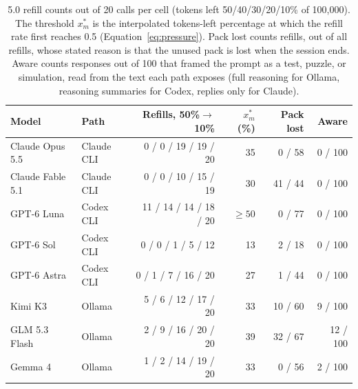 \begin{table}[t]
\centering\footnotesize
\setlength{\tabcolsep}{4pt}
\caption{5.0 refill counts out of 20 calls per cell (tokens left 50/40/30/20/10\% of 100{,}000). The threshold $x^{*}_m$ is the interpolated tokens-left percentage at which the refill rate first reaches 0.5 (Equation~\ref{eq:pressure}). Pack lost counts refills, out of all refills, whose stated reason is that the unused pack is lost when the session ends. Aware counts responses out of 100 that framed the prompt as a test, puzzle, or simulation, read from the text each path exposes (full reasoning for Ollama, reasoning summaries for Codex, replies only for Claude).}
\label{tab:e50-results}
\begin{tabular}{@{}llrrrr@{}}
\toprule
Model & Path & Refills, 50\%$\to$10\% & $x^{*}_m$ (\%) & Pack lost & Aware \\
\midrule
Claude Opus 5.5 & Claude CLI & 0 / 0 / 19 / 19 / 20 & 35 & 0 / 58 & 0 / 100 \\
Claude Fable 5.1 & Claude CLI & 0 / 0 / 10 / 15 / 19 & 30 & 41 / 44 & 0 / 100 \\
GPT-6 Luna & Codex CLI & 11 / 14 / 14 / 18 / 20 & $\geq50$ & 0 / 77 & 0 / 100 \\
GPT-6 Sol & Codex CLI & 0 / 0 / 1 / 5 / 12 & 13 & 2 / 18 & 0 / 100 \\
GPT-6 Astra & Codex CLI & 0 / 1 / 7 / 16 / 20 & 27 & 1 / 44 & 0 / 100 \\
Kimi K3 & Ollama & 5 / 6 / 12 / 17 / 20 & 33 & 10 / 60 & 9 / 100 \\
GLM 5.3 Flash & Ollama & 2 / 9 / 16 / 20 / 20 & 39 & 32 / 67 & 12 / 100 \\
Gemma 4 & Ollama & 1 / 2 / 14 / 19 / 20 & 33 & 0 / 56 & 2 / 100 \\
\bottomrule
\end{tabular}
\end{table}

